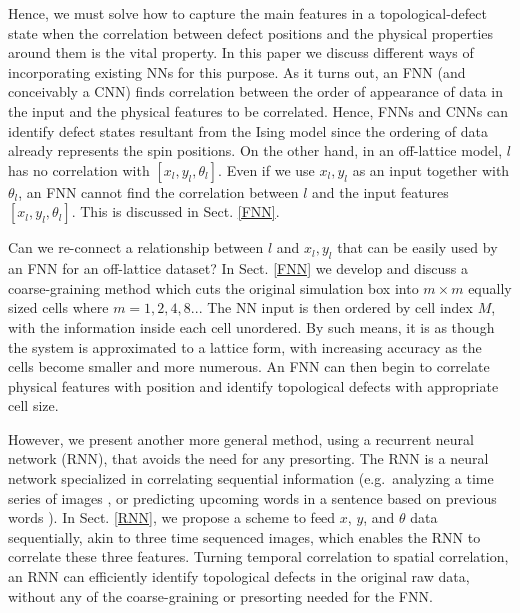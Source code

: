 Hence, we must solve how to capture the main features in a topological-defect state when the correlation between defect positions and the physical properties around them is the vital property. In this paper we discuss different ways of incorporating existing NNs for this purpose. As it turns out, an FNN (and conceivably a CNN) finds correlation between the order of appearance of data in the input and the physical features to be correlated. Hence, FNNs and CNNs  can identify defect states resultant from the Ising model since the ordering of data already represents the spin positions. On the other hand, in an off-lattice model, $l$ has no correlation with  $[x_l,y_l, \theta_l]$. Even if we use $x_l, y_l$ as an input together with $\theta_l$, an FNN cannot find the correlation between $l$ and the input features $[x_l,y_l, \theta_l]$. This is discussed in Sect. \ref{FNN}.

Can we re-connect a relationship between $l$ and $x_l, y_l$ that can be easily used by an FNN for an off-lattice dataset? In Sect.
\ref{FNN} we develop and discuss a coarse-graining method which cuts the original simulation box into $m\times m$ equally sized cells where $m=1,2,4,8..$. The NN input is then ordered by cell index $M$, with the information inside each cell unordered. By such means, it is as though the system is approximated to a lattice form, with increasing accuracy as the cells become smaller and more numerous. An FNN can then begin to correlate physical features with position and identify topological defects with appropriate cell size.

However, we present another more general method, using a recurrent neural network (RNN), that avoids the need for any presorting.
The RNN is a neural network specialized in correlating sequential information (e.g.\ analyzing a time series of images \cite{rnnvideo}, or predicting upcoming words in a sentence based on previous words \cite{rnnwords1,rnnwords2}). In Sect. \ref{RNN}, we propose a scheme to feed
$x$, $y$, and $\theta$ data sequentially, akin to three time sequenced images, which enables the RNN to correlate these three features. Turning temporal correlation to spatial correlation, an RNN can efficiently identify topological defects in the original raw data, without any of the coarse-graining or presorting needed for the FNN.

